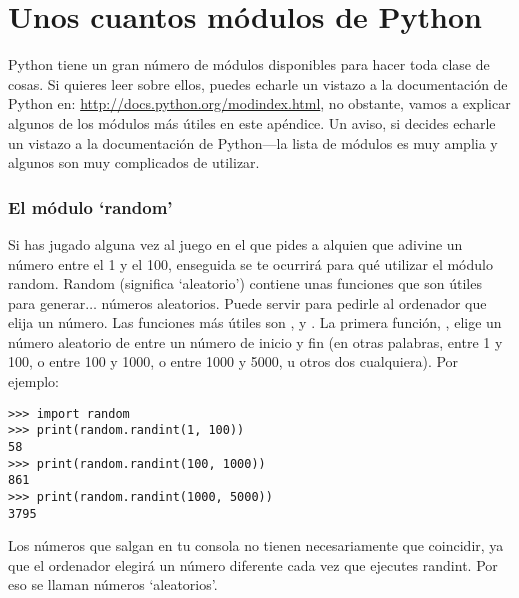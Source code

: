 

\chapter{Unos cuantos módulos de Python}\label{app:afewpythonmodules}

Python tiene un gran número de módulos disponibles para hacer toda clase de cosas.   Si quieres leer sobre ellos, puedes echarle un vistazo a la documentación de Python en: \href{http://docs.python.org/modindex.html}{http://docs.python.org/modindex.html}, no obstante, vamos a explicar algunos de los módulos más útiles en este apéndice.   Un aviso, si decides echarle un vistazo a la documentación de Python---la lista de módulos es muy amplia y algunos son muy complicados de utilizar.

\subsection*{El módulo `random'}

Si has jugado alguna vez al juego en el que pides a alquien que adivine un número entre el 1 y el 100, enseguida se te ocurrirá para qué utilizar el módulo random.   Random (significa `aleatorio') contiene unas funciones que son útiles para generar$\ldots$ números aleatorios. Puede servir para pedirle al ordenador que elija un número.   Las funciones más útiles son ,  y . La primera función, ,  elige un número aleatorio de entre un número de inicio y fin (en otras palabras, entre 1 y 100, o entre 100 y 1000, o entre 1000 y 5000, u otros dos cualquiera).  Por ejemplo:

\begin{listingignore}
\begin{verbatim}
>>> import random
>>> print(random.randint(1, 100))
58
>>> print(random.randint(100, 1000))
861
>>> print(random.randint(1000, 5000))
3795
\end{verbatim}
\end{listingignore}

Los números que salgan en tu consola no tienen necesariamente que coincidir, ya que el ordenador elegirá un número diferente cada vez que ejecutes randint. Por eso se llaman números `aleatorios'.

